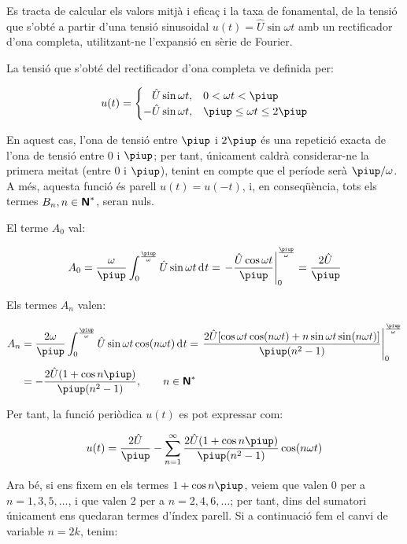 	
\begin{exemple}[\ValorMitjaEfTaxaFon{}]
	\addcontentsxms{\ValorMitjaEfTaxaFon}
    Es tracta de calcular els valors mitjà i eficaç i la taxa de
    fonamental, de la tensió que s'obté a partir d'una tensió
    sinusoidal $u(t) = \hat{U} \sin\omega t$ amb un rectificador d'ona
    completa, utilitzant-ne l'expansió en sèrie de Fourier.

    La tensió que s'obté del rectificador d'ona completa ve definida
    per:

    \[
    u(t) = \begin{cases} \phantom{-}\hat{U} \sin\omega t, & 0 < \omega t < \piup\\
           -\hat{U} \sin\omega t, & \piup \leq \omega t \leq 2\piup \end{cases}
    \]

    En aquest cas, l'ona de tensió entre $\piup$ i $2\piup$ és una repetició
    exacta de l'ona de tensió entre 0 i $\piup$; per tant, únicament
    caldrà considerar-ne la primera meitat (entre 0 i $\piup$), tenint en
    compte que el període serà $\piup/\omega$. A més, aquesta funció és
    parell $u(t) = u(-t)$, i, en conseqüència, tots els termes
    $B_n, n \in {\ensuremath{\boldsymbol{\mathsf{N}}}}^*$, seran nuls.

    El terme $A_0$ val:

    \[
    A_0 = \frac{\omega}{\piup} \int_0^{\frac{\piup}{\omega}} \hat{U} \sin
    \omega t \diff t = \left. -\frac{\hat{U} \cos \omega t}{\piup}
    \right|_0^{\frac{\piup}{\omega}} = \frac{2\hat{U}}{\piup}
    \]

    Els termes $A_n$ valen:

    \[
    \begin{split}
    A_n &= \frac{2 \omega}{\piup} \int_0^{\frac{\piup}{\omega}} \hat{U} \sin
    \omega t \cos(n \omega t)\diff t = \left. \frac{2 \hat{U}[ \cos
    \omega t \cos (n \omega t) + n \sin \omega t \sin(n \omega
    t)]}{\piup(n^2-1)} \right|_0^{\frac{\piup}{\omega}}\\[0.5ex]
    &= -\frac{2\hat{U}(1+\cos n \piup)}{\piup(n^2-1)},
    \qquad n \in \mathsfb{N}^*
    \end{split}
    \]

    Per tant, la funció periòdica $u(t)$ es pot expressar com:

    \[
        u(t) = \frac{2\hat{U}}{\piup} - \sum_{n=1}^\infty
         \frac{2\hat{U}(1+\cos n \piup)}{\piup(n^2-1)} \cos(n \omega t)
    \]

    Ara bé, si ens fixem en els termes $1+\cos n \piup$, veiem que valen 0
    per a $n=1,3,5,\ldots$, i que valen 2 per a $n=2,4,6,\ldots$; per tant, dins
    del sumatori únicament ens quedaran termes d'índex parell. Si a
    continuació fem el canvi de variable $n=2k$, tenim:


\end{exemple}
